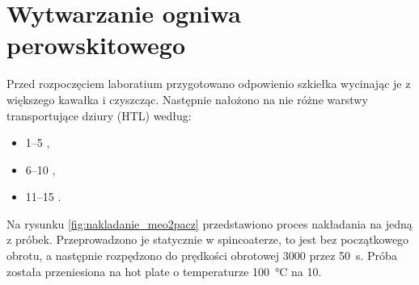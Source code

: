 \documentclass[a4, 12pt]{article}
\begin{document}
	
	
	\section{Wytwarzanie ogniwa perowskitowego}
	Przed rozpoczęciem laboratium przygotowano odpowienio szkiełka wycinając je z większego kawałka i czyszcząc. Następnie nałożono na nie różne warstwy transportujące dziury (HTL) według:
	\begin{itemize}
		\item \numrange{1}{5} \;\textemdash\; , 
		\item \numrange{6}{10} \;\textemdash\; , 
		\item \numrange{11}{15} \;\textemdash\; .
	\end{itemize}
	Na rysunku \ref{fig:nakladanie_meo2pacz} przedstawiono proces nakładania  na jedną z próbek. Przeprowadzono je statycznie w spincoaterze, to jest bez początkowego obrotu, a następnie rozpędzono do prędkości obrotowej \qty{3000}{\rpm} przez \qty{50}{\s}. Próba została przeniesiona na hot plate o temperaturze \qty{100}{\degreeCelsius} na \qty{10}{\min}.
	
\end{document}
